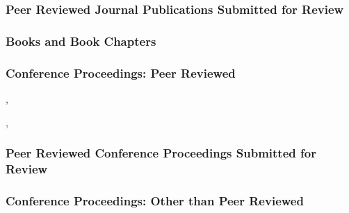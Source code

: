 \begin{revjournalbib}[start=3]
  \item {}
\end{revjournalbib}

\subsubsection{Peer Reviewed Journal Publications Submitted for Review}

\subsubsection{Books and Book Chapters}

\subsubsection{Conference Proceedings: Peer Reviewed}

\begin{revconferencebib}
\item {}, 
\item {}, 
\end{revconferencebib}


\subsubsection*{Peer Reviewed Conference Proceedings Submitted for Review}


\subsubsection{Conference Proceedings: Other than Peer Reviewed}


